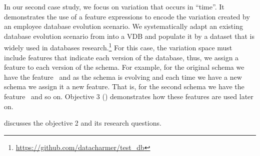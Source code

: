 In our second case study, we focus on variation that occurs in ``time''.
It demonstrates the use of a feature expressions to encode the variation created by
 an employee database evolution
scenario. We systematically adapt an existing database evolution scenario from
\citet{prima08Moon} into a VDB and populate it by a dataset that is widely used
in databases research.\footnote{\url{https://github.com/datacharmer/test_db}}
%
For this case, the variation space must include features that indicate
each version of the database, thus,
we assign a feature to each version of the schema.
For example, for the original schema we have the feature \vOne\ and
as the schema is evolving and each time we have a new schema we 
assign it a new feature. That is, for the second schema we have the 
feature \vTwo\ and so on. 
%
Objective 3 () demonstrates how these features are used later on.

 discusses the objective 2 and its research questions.




